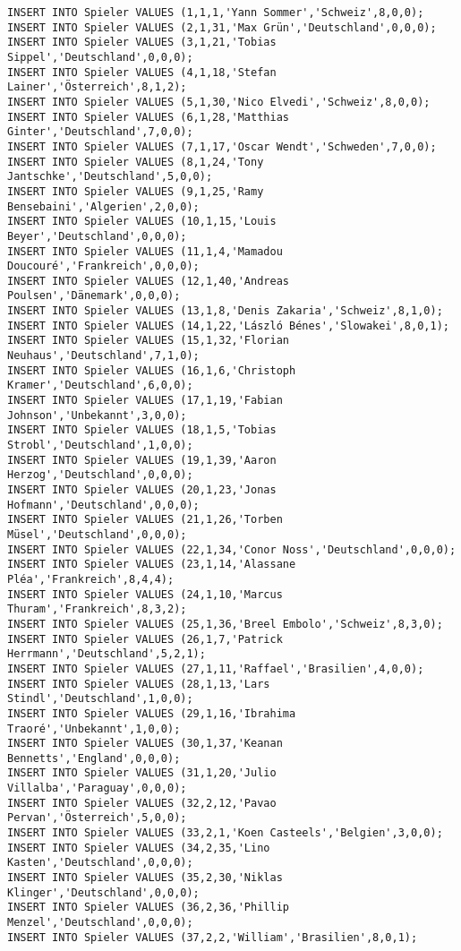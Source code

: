 \documentclass{bschlangaul-aufgabe}
\begin{document}
\begin{verbatim}
INSERT INTO Spieler VALUES (1,1,1,'Yann Sommer','Schweiz',8,0,0);
INSERT INTO Spieler VALUES (2,1,31,'Max Grün','Deutschland',0,0,0);
INSERT INTO Spieler VALUES (3,1,21,'Tobias Sippel','Deutschland',0,0,0);
INSERT INTO Spieler VALUES (4,1,18,'Stefan Lainer','Österreich',8,1,2);
INSERT INTO Spieler VALUES (5,1,30,'Nico Elvedi','Schweiz',8,0,0);
INSERT INTO Spieler VALUES (6,1,28,'Matthias Ginter','Deutschland',7,0,0);
INSERT INTO Spieler VALUES (7,1,17,'Oscar Wendt','Schweden',7,0,0);
INSERT INTO Spieler VALUES (8,1,24,'Tony Jantschke','Deutschland',5,0,0);
INSERT INTO Spieler VALUES (9,1,25,'Ramy Bensebaini','Algerien',2,0,0);
INSERT INTO Spieler VALUES (10,1,15,'Louis Beyer','Deutschland',0,0,0);
INSERT INTO Spieler VALUES (11,1,4,'Mamadou Doucouré','Frankreich',0,0,0);
INSERT INTO Spieler VALUES (12,1,40,'Andreas Poulsen','Dänemark',0,0,0);
INSERT INTO Spieler VALUES (13,1,8,'Denis Zakaria','Schweiz',8,1,0);
INSERT INTO Spieler VALUES (14,1,22,'László Bénes','Slowakei',8,0,1);
INSERT INTO Spieler VALUES (15,1,32,'Florian Neuhaus','Deutschland',7,1,0);
INSERT INTO Spieler VALUES (16,1,6,'Christoph Kramer','Deutschland',6,0,0);
INSERT INTO Spieler VALUES (17,1,19,'Fabian Johnson','Unbekannt',3,0,0);
INSERT INTO Spieler VALUES (18,1,5,'Tobias Strobl','Deutschland',1,0,0);
INSERT INTO Spieler VALUES (19,1,39,'Aaron Herzog','Deutschland',0,0,0);
INSERT INTO Spieler VALUES (20,1,23,'Jonas Hofmann','Deutschland',0,0,0);
INSERT INTO Spieler VALUES (21,1,26,'Torben Müsel','Deutschland',0,0,0);
INSERT INTO Spieler VALUES (22,1,34,'Conor Noss','Deutschland',0,0,0);
INSERT INTO Spieler VALUES (23,1,14,'Alassane Pléa','Frankreich',8,4,4);
INSERT INTO Spieler VALUES (24,1,10,'Marcus Thuram','Frankreich',8,3,2);
INSERT INTO Spieler VALUES (25,1,36,'Breel Embolo','Schweiz',8,3,0);
INSERT INTO Spieler VALUES (26,1,7,'Patrick Herrmann','Deutschland',5,2,1);
INSERT INTO Spieler VALUES (27,1,11,'Raffael','Brasilien',4,0,0);
INSERT INTO Spieler VALUES (28,1,13,'Lars Stindl','Deutschland',1,0,0);
INSERT INTO Spieler VALUES (29,1,16,'Ibrahima Traoré','Unbekannt',1,0,0);
INSERT INTO Spieler VALUES (30,1,37,'Keanan Bennetts','England',0,0,0);
INSERT INTO Spieler VALUES (31,1,20,'Julio Villalba','Paraguay',0,0,0);
INSERT INTO Spieler VALUES (32,2,12,'Pavao Pervan','Österreich',5,0,0);
INSERT INTO Spieler VALUES (33,2,1,'Koen Casteels','Belgien',3,0,0);
INSERT INTO Spieler VALUES (34,2,35,'Lino Kasten','Deutschland',0,0,0);
INSERT INTO Spieler VALUES (35,2,30,'Niklas Klinger','Deutschland',0,0,0);
INSERT INTO Spieler VALUES (36,2,36,'Phillip Menzel','Deutschland',0,0,0);
INSERT INTO Spieler VALUES (37,2,2,'William','Brasilien',8,0,1);

\end{verbatim}
\end{document}
